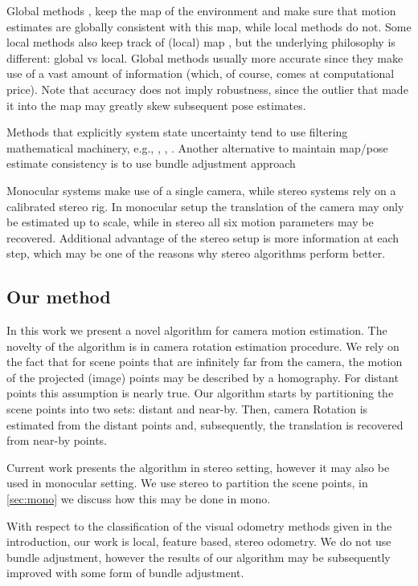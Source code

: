 \documentclass[runningheads]{llncs}
\begin{document}
Global methods \cite{Klein2007}, \cite{Newcombe2011} keep the map of
the environment and make sure that motion estimates are globally
consistent with this map, while local methods do not.  Some local
methods \cite{Badino2013} also keep track of (local) map , but the
underlying philosophy is different: global vs local.  Global methods
usually more accurate since they make use of a vast amount of
information (which, of course, comes at computational price).  Note
that accuracy does not imply robustness, since the outlier that made
it into the map may greatly skew subsequent pose estimates.

Methods that explicitly system state uncertainty tend to use filtering
mathematical machinery, e.g., \cite{Konolige2010}, \cite{Olson2003},
\cite{Kaess2008}.  Another alternative to maintain map/pose estimate
consistency is to use bundle adjustment approach \cite{Triggs2000}

Monocular systems \cite{Song} make use of a single camera, while
stereo systems \cite{Geiger2011} rely on a calibrated stereo rig. In
monocular setup the translation of the camera may only be estimated up
to scale, while in stereo all six motion parameters may be
recovered. Additional advantage of the stereo setup is more
information at each step, which may be one of the reasons why stereo
algorithms perform better.

\subsection{Our method}

In this work we present a novel algorithm for camera motion
estimation.  The novelty of the algorithm is in camera rotation
estimation procedure.  We rely on the fact that for scene points that
are infinitely far from the camera, the motion of the projected
(image) points may be described by a homography. For distant points
this assumption is nearly true.  Our algorithm starts by partitioning
the scene points into two sets: distant and near-by. Then, camera
Rotation is estimated from the distant points and, subsequently, the
translation is recovered from near-by points.

Current work presents the algorithm in stereo setting, however it may
also be used in monocular setting. We use stereo to partition the
scene points, in \ref{sec:mono} we discuss how this may be done in
mono.

With respect to the classification of the visual odometry methods
given in the introduction, our work is local, feature based, stereo
odometry.  We do not use bundle adjustment, however the results of our
algorithm may be subsequently improved with some form of bundle
adjustment.
\end{document}
